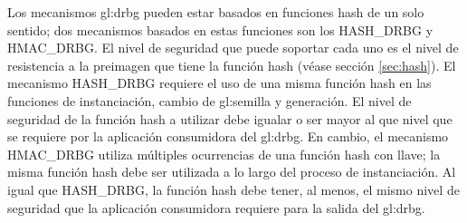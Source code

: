 %
%

Los mecanismos \gls{gl:drbg} pueden estar basados en funciones hash de un
solo sentido; dos mecanismos basados en estas funciones son los HASH\_DRBG 
y HMAC\_DRBG. El nivel de seguridad que puede soportar cada uno es el nivel de
resistencia a la preimagen que tiene la función hash (véase sección
\ref{sec:hash}).
El mecanismo HASH\_DRBG requiere el uso de una misma función hash en las 
funciones de instanciación, cambio de \gls{gl:semilla} y generación. El nivel
de seguridad de la función hash a utilizar debe igualar o ser mayor al que
nivel que se requiere por la aplicación consumidora del \gls{gl:drbg}. En
cambio, el mecanismo HMAC\_DRBG utiliza múltiples ocurrencias de una función
hash con llave; la misma función hash debe ser utilizada a lo largo del proceso
de instanciación. Al igual que HASH\_DRBG, la función hash debe tener, al menos,
el mismo nivel de seguridad que la aplicación consumidora requiere para la 
salida del \gls{gl:drbg}.